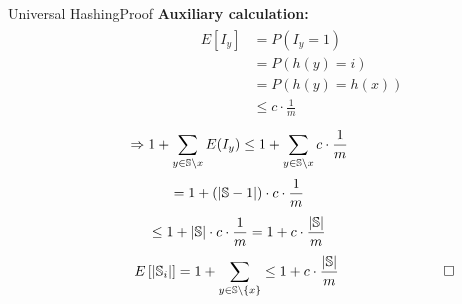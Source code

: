 
\begin{frame}{Universal Hashing}{Proof}
  \textbf{Auxiliary calculation:}
         {\color{Mittel-Blau}
           \vspace*{-2em}
           \begin{align*}
             \hspace{6em}           
             \begin{array}{rl}
               E[I_y] & = P(I_y = 1)\\
               {} & = P(h(y) = i)\\
               {} & = P(h(y) = h(x))\\
               {} & \leq c \cdot \frac{1}{m}
             \end{array}
         \end{align*}}
         {\color{Mittel-Blau}
           \vspace{-0.6em}
           \begin{displaymath}
             \hspace*{-3em}
             \Rightarrow 1 + \sum_{y \in \mathbb{S} \setminus x} E(I_y)
             \leq 1 + \sum_{y \in \mathbb{S} \setminus x} c \cdot \frac{1}{m}
           \end{displaymath}
           \vspace{-0.6em}
           \begin{displaymath}
             \hspace*{-3em}
             = 1 + \left(\vert \mathbb{S} - 1 \vert \right) \cdot c \cdot \frac{1}{m}
           \end{displaymath}
           \vspace{-0.6em}
           \begin{displaymath}
             \hspace*{-3em}
             \displaystyle \leq 1 + \vert \mathbb{S} \vert \cdot c \cdot \frac{1}{m}
             = 1 + c \cdot \frac{\vert \mathbb{S} \vert}{m}
           \end{displaymath}
           \vspace{-0.6em}
           \begin{displaymath}
             \hspace*{5em}
             E\left[\vert \mathbb{S}_i \vert\right]
             = 1 + \sum_{y \in \mathbb{S} \setminus \{x\}}
             \leq 1 + c \cdot \frac{\vert \mathbb{S} \vert}{m}
             \hspace*{7.5em}\square
         \end{displaymath}}
\end{frame}
